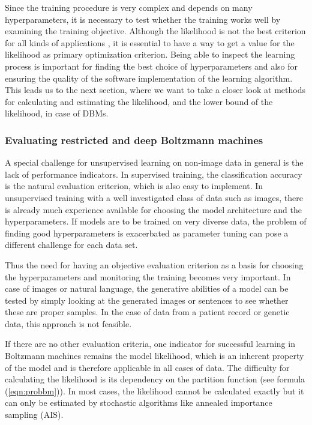 \documentclass[12pt]{article}
\begin{document}
Since the training procedure is very complex and depends on many hyperparameters, it is necessary to test whether the training works well by examining the training objective.
Although the likelihood is not the best criterion for all kinds of applications \citep{theis_note_2015}, it is essential to have a way to get a value for the likelihood as primary optimization criterion.
Being able to inspect the learning process is important for finding the best choice of hyperparameters and also for ensuring the quality of the software implementation of the learning algorithm.
This leads us to the next section, where we want to take a closer look at methods for calculating and estimating the likelihood, and the lower bound of the likelihood, in case of DBMs.


\subsubsection{Evaluating restricted and deep Boltzmann machines}
A special challenge for unsupervised learning on non-image data in general is the lack of performance indicators.
In supervised training, the classification accuracy is the natural evaluation criterion, which is also easy to implement.
In unsupervised training with a well investigated class of data such as images, there is already much experience available for choosing the model architecture and the hyperparameters. If models are to be trained on very diverse data, the problem of finding good hyperparameters is exacerbated as parameter tuning can pose a different challenge for each data set.

Thus the need for having an objective evaluation criterion as a basis for choosing the hyperparameters and monitoring the training becomes very important.
In case of images or natural language, the generative abilities of a model can be tested by simply looking at the generated images or sentences to see whether these are proper samples. In the case of data from a patient record or genetic data, this approach is not feasible.

If there are no other evaluation criteria, one indicator for successful learning in Boltzmann machines remains the model likelihood, which is an inherent property of the model and is therefore applicable in all cases of data. The difficulty for calculating the likelihood is its dependency on the partition function (see formula (\ref{eqn:probbm})).
In most cases, the likelihood cannot be calculated exactly but it can only be estimated by stochastic algorithms like annealed importance sampling (AIS).
\end{document}
